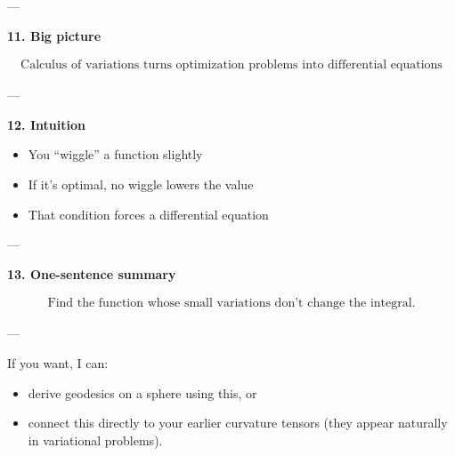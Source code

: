 \documentclass[12pt,a4paper]{report}
\begin{document}
\begin{description}
---

\item \textbf{11. Big picture}

\begin{align*}
\boxed{
\text{Calculus of variations turns optimization problems into differential equations}
}
\end{align*}

---

\item \textbf{12. Intuition}

\begin{itemize}
\item You “wiggle” a function slightly
\item If it’s optimal, no wiggle lowers the value
\item That condition forces a differential equation
\end{itemize}

---

\item \textbf{13. One-sentence summary}

\begin{align*}
\boxed{
\text{Find the function whose small variations don’t change the integral.}
}
\end{align*}
\end{description}

---

If you want, I can:

\begin{itemize}
\item derive geodesics on a sphere using this, or
\item connect this directly to your earlier curvature tensors (they appear naturally in variational problems).
\end{itemize}
\end{document}
